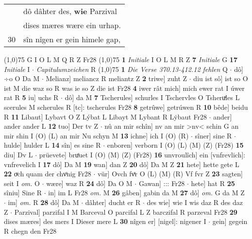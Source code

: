 \documentclass[8pt,a4paper,notitlepage]{article}
\begin{document}
\begin{table}[ht]
\begin{minipage}[t]{0.5\linewidth}
\begin{tabular}{rl}
 & dô dâhter des, \textbf{wie} Parzival\\ 
 & dises mæres wære ein urhap.\\ 
30 & sîn nîgen er gein himele gap,\\ 
\end{tabular}
\scriptsize
\line(1,0){75} \newline
G I O L M Q R Z Fr28 \newline
\line(1,0){75} \newline
\textbf{1} \textit{Initiale} I O L M R Z  \textbf{7} \textit{Initiale} G  \textbf{17} \textit{Initiale} I   $\cdot$ \textit{Capitulumzeichen} R  \newline
\line(1,0){75} \newline
\textbf{1} \textit{Die Verse 370.13-412.12 fehlen} Q   $\cdot$ dô] ÷o O Da M  $\cdot$ Melianz] meliancz R meliantz Z \textbf{2} triwe] zuht Z  $\cdot$ diu ist sô] ist so O ist M die waz so R was ie so Z die ist Fr28 \textbf{4} iwer rât mich] mich ewer rat I úwer rat R \textbf{5} iu] uchs R  $\cdot$ dô] da M \textbf{7} Tscherules] schurles I Tschervles O Tsheruͯles L scerules M scherules R [tc]: tscherules Fr28 \textbf{8} getrûwe] getrúwen R \textbf{10} bêde] beidu R \textbf{11} Libaut] Lybavt O Z Lýbat L Libayt M Lybant R Lẏbaut Fr28  $\cdot$ ander] ander ander L \textbf{12} tuo] Der tv Z  $\cdot$ nû an mir schîn] nv an mir >nv< schin G an mir shin I (O) (L) an mir Nu schyn M \textbf{13} ichne] ich I (O) (R)  $\cdot$ sîner] sine R  $\cdot$ hulde] hulder L \textbf{14} sîn] es sine R  $\cdot$ enboren] verborn I (O) (L) (M) (Z) (Fr28) \textbf{15} diu] Dv L  $\cdot$ prüevete] bruͤuet I (O) (M) (Z) (Fr28) \textbf{16} unvroulîch] ein [vnfrevlich]: vnfrevelich I \textbf{17} dô] Da M \textbf{19} wan] dan Z \textbf{20} dô] Da M Z \textbf{21} hete] hette gete L \textbf{22} oͮch quam der chvͦnig Fr28  $\cdot$ vür] Ovch fvͤr O (L) (M) (R) Vf fvr Z \textbf{23} sagten] seit I \textit{om.} O  $\cdot$ wære] waz R \textbf{24} dô] Da O M  $\cdot$ Gawan] ::: Fr28  $\cdot$ hete] hat R \textbf{25} sîniu] Sine R  $\cdot$ in] im L Fr28 \textit{om.} M \textbf{26} gâben] gabin da M \textbf{27} dô] \textit{om.} G da M Z  $\cdot$ im] \textit{om.} R \textbf{28} dô] Da M  $\cdot$ dâhter] ducht er R  $\cdot$ des wie] wie I wis daz R des daz Z  $\cdot$ Parzival] parzifal I M Barceval O parcifal L Z barczifal R parzeval Fr28 \textbf{29} dises mæres] des mers I Dieser mere L \textbf{30} nîgen er] [nigel]: nigener I  $\cdot$ gein] gegein R chegn den Fr28 \newline
\end{minipage}

\end{table}
\end{document}
